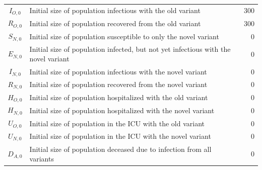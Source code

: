 \begin{xltabular}{\columnwidth}{c>{\RaggedRight}Xr}
\( I_{O,0} \) & Initial size of population infectious with the old variant & 300 \\
\( R_{O,0} \) & Initial size of population recovered from the old variant & 300 \\
\( S_{N,0} \) & Initial size of population susceptible to only the novel variant & 0 \\
\( E_{N,0} \) & Initial size of population infected, but not yet infectious with the novel variant & 0 \\
\( I_{N,0} \) & Initial size of population infectious with the novel variant & 0 \\
\( R_{N,0} \) & Initial size of population recovered from the novel variant & 0 \\
\( H_{O,0} \) & Initial size of population hospitalized with the old variant & 0 \\
\( H_{N,0} \) & Initial size of population hospitalized with the novel variant & 0 \\
\( U_{O,0} \) & Initial size of population in the ICU with the old variant & 0 \\
\( U_{N,0} \) & Initial size of population in the ICU with the novel variant & 0 \\
\( D_{A,0} \) & Initial size of population deceased due to infection from all variants & 0
\end{xltabular}

